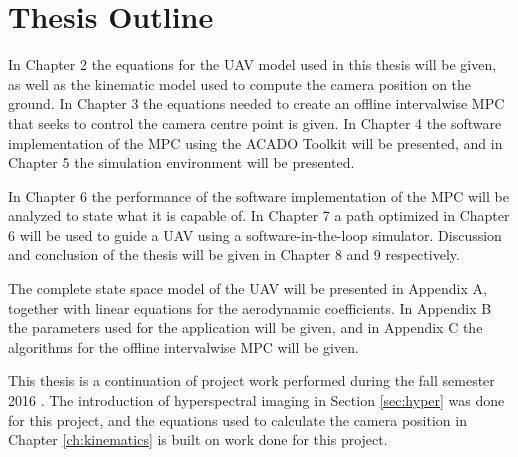 \section{Thesis Outline}

In Chapter 2 the equations for the UAV model used in this thesis will be given, as well as the kinematic model used to compute the camera position on the ground. In Chapter 3 the equations needed to create an offline intervalwise MPC that seeks to control the camera centre point is given. In Chapter 4 the software implementation of the MPC using the ACADO Toolkit will be presented, and in Chapter 5 the simulation environment will be presented.

In Chapter 6 the performance of the software implementation of the MPC will be analyzed to state what it is capable of. In Chapter 7 a path optimized in Chapter 6 will be used to guide a UAV using a software-in-the-loop simulator. Discussion and conclusion of the thesis will be given in Chapter 8 and 9 respectively.

The complete state space model of the UAV will be presented in Appendix A, together with linear equations for the aerodynamic coefficients. In Appendix B the parameters used for the application will be given, and in Appendix C the algorithms for the offline intervalwise MPC will be given.

This thesis is a continuation of project work performed during the fall semester 2016 \cite{prosjekt}. The introduction of hyperspectral imaging in Section \ref{sec:hyper} was done for this project, and the equations used to calculate the camera position in Chapter \ref{ch:kinematics} is built on work done for this project.
